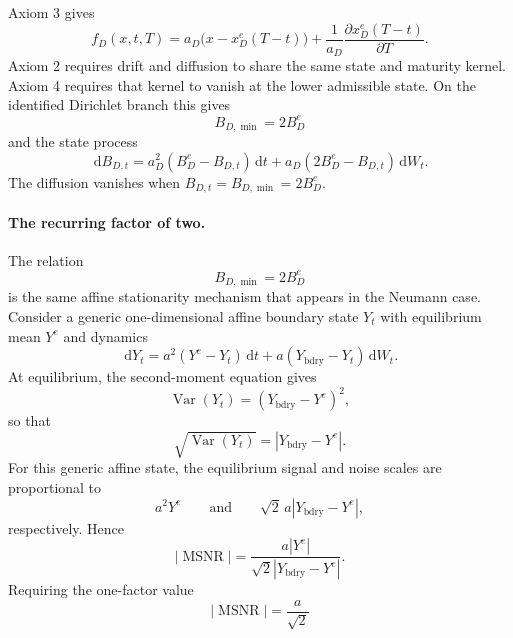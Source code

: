 \documentclass[12pt]{article}
\numberwithin{equation}{subsection}
\newcommand{\MSNR}{\operatorname{MSNR}}
\newcommand{\dd}{\,\mathrm{d}}
\begin{document}
Axiom 3 gives
\begin{equation}
f_D(x,t,T)
=
a_D\bigl(x-x_D^e(T-t)\bigr)
+
\frac{1}{a_D}\frac{\partial x_D^e(T-t)}{\partial T}.
\end{equation}
Axiom 2 requires drift and diffusion to share the same state and maturity kernel. Axiom 4 requires that kernel to vanish at the lower admissible state. On the identified Dirichlet branch this gives
\begin{equation}
B_{D,\min}=2B_D^e
\end{equation}
and the state process
\begin{equation}
\dd B_{D,t}
=
a_D^2(B_D^e-B_{D,t})\dd t
+
a_D(2B_D^e-B_{D,t})\dd W_t.
\end{equation}
The diffusion vanishes when $B_{D,t}=B_{D,\min}=2B_D^e$.

\paragraph{The recurring factor of two.}
The relation
\begin{equation}
B_{D,\min}=2B_D^e
\end{equation}
is the same affine stationarity mechanism that appears in the Neumann case. Consider a generic one-dimensional affine boundary state $Y_t$ with equilibrium mean $Y^e$ and dynamics
\begin{equation}
\dd Y_t
=
a^2(Y^e-Y_t)\dd t
+
a(Y_{\mathrm{bdry}}-Y_t)\dd W_t.
\end{equation}
At equilibrium, the second-moment equation gives
\begin{equation}
\operatorname{Var}(Y_t)
=
\left(Y_{\mathrm{bdry}}-Y^e\right)^2,
\end{equation}
so that
\begin{equation}
\sqrt{\operatorname{Var}(Y_t)}
=
\left|Y_{\mathrm{bdry}}-Y^e\right|.
\end{equation}
For this generic affine state, the equilibrium signal and noise scales are proportional to
\begin{equation}
a^2Y^e
\qquad\text{and}\qquad
\sqrt{2}\,a\left|Y_{\mathrm{bdry}}-Y^e\right|,
\end{equation}
respectively. Hence
\begin{equation}
\left|\MSNR\right|
=
\frac{a\left|Y^e\right|}
{\sqrt{2}\left|Y_{\mathrm{bdry}}-Y^e\right|}.
\end{equation}
Requiring the one-factor value
\begin{equation}
\left|\MSNR\right|=\frac{a}{\sqrt{2}}
\end{equation}
\end{document}
